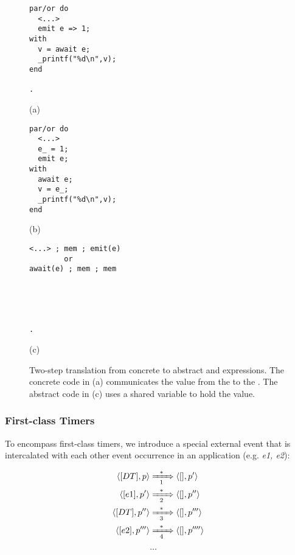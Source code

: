 \begin{figure}[t]
\begin{minipage}[t]{0.32\linewidth}
\begin{lstlisting}
par/or do
  <...>
  emit e => 1;
with
  v = await e;
  _printf("%d\n",v);
end

.
\end{lstlisting}
\centering\small{(a)}
\end{minipage}
%
\begin{minipage}[t]{0.32\linewidth}
\begin{lstlisting}
par/or do
  <...>
  e_ = 1;
  emit e;
with
  await e;
  v = e_;
  _printf("%d\n",v);
end
\end{lstlisting}
\centering\small{(b)}
\end{minipage}
%
\begin{minipage}[t]{0.32\linewidth}
\begin{lstlisting}
<...> ; mem ; emit(e)
        or
await(e) ; mem ; mem





.
\end{lstlisting}
\centering\small{(c)}
\end{minipage}
\caption{
Two-step translation from concrete to abstract  and  
expressions.
The concrete code in (a) communicates the value  from the  
to the .
The abstract code in (c) uses a shared variable to hold the value.
\label{lst.map.emit.await}
}
\end{figure}

\subsubsection{First-class Timers}

To encompass first-class timers, we introduce a special external event 
 that is intercalated with each other event occurrence in an 
application (e.g.  \emph{e1, e2}):

\begin{align*}
\langle [DT], p \rangle
    & \xRightarrow[~~1~~]{*}
\langle [    ], p' \rangle
\\
\langle [e1], p' \rangle
    & \xRightarrow[~~2~~]{*}
\langle [  ], p'' \rangle
\\
\langle [DT], p'' \rangle
    & \xRightarrow[~~3~~]{*}
\langle [    ], p''' \rangle
\\
\langle [e2], p''' \rangle
    & \xRightarrow[~~4~~]{*}
\langle [  ], p'''' \rangle
\\
& ...
\end{align*}

